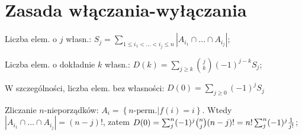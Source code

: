 \section{Zasada włączania-wyłączania}

\entry
Liczba elem. o $j$ własn.: $S_j =
  \sum_{1 \leq i_1 < \dots < i_j \leq n} |A_{i_1} \cap \dots \cap A_{i_j}|$;

\entry
Liczba elem. o dokładnie $k$ własn.:
  $D(k) = \sum_{j\geq k} \binom{j}{k} (-1)^{j-k}S_j$;

\entry 
W szczególności, liczba elem. bez własności: $D(0) = \sum_{j\geq 0}(-1)^jS_j$

\entry
Zliczanie $n$-nieporządków: $A_i = \left\{n\text{-perm.} | f(i) = i \right\}$.
  Wtedy $|A_{i_1} \cap \dots \cap A_{i_j}| = (n-j)!$, zatem
  $D(0) = \sum^n_j(-1)^j\binom{n}{j}(n-j)!=n!\sum^n_j(-1)^j{1 \over j!}$;
